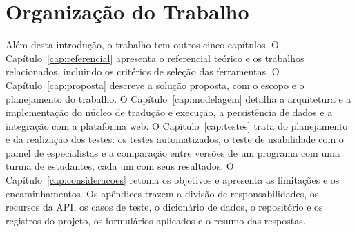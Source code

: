 \section{Organização do Trabalho}

Além desta introdução, o trabalho tem outros cinco capítulos. O Capítulo~\ref{cap:referencial} apresenta o referencial teórico e os trabalhos relacionados, incluindo os critérios de seleção das ferramentas. O Capítulo~\ref{cap:proposta} descreve a solução proposta, com o escopo e o planejamento do trabalho. O Capítulo~\ref{cap:modelagem} detalha a arquitetura e a implementação do núcleo de tradução e execução, a persistência de dados e a integração com a plataforma web. O Capítulo~\ref{cap:testes} trata do planejamento e da realização dos testes: os testes automatizados, o teste de usabilidade com o painel de especialistas e a comparação entre versões de um programa com uma turma de estudantes, cada um com seus resultados. O Capítulo~\ref{cap:consideracoes} retoma os objetivos e apresenta as limitações e os encaminhamentos. Os apêndices trazem a divisão de responsabilidades, os recursos da API, os casos de teste, o dicionário de dados, o repositório e os registros do projeto, os formulários aplicados e o resumo das respostas.